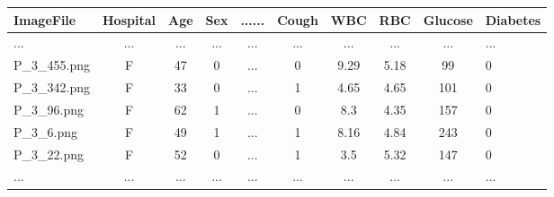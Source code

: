 \begin{tcolorbox}[tab2,tabularx={Y|Y|Y|Y|Y|Y|Y|Y|Y|Y|Y},title=\text{Estratto del dataset di test, in seguito alle modifiche}, width=1.25\textwidth, center=\textwidth]
    \centering
    \begin{tabular}{l|c|c|c|c|c|c|c|c|l}
        ImageFile & Hospital & Age & Sex & ...... & Cough & WBC & RBC & Glucose & Diabetes   \\ \hline \hline
        ... & ... & ... & ... & ... & ... & ... & ... & ... & ...\\
        P\_3\_455.png & F & 47 & 0 &...& 0 & 9.29 & 5.18 & 99  & 0  \\
        P\_3\_342.png & F & 33 & 0 &... & 1  & 4.65 & 4.65 & 101  & 0   \\
        P\_3\_96.png & F & 62 & 1 &... & 0  & 8.3 & 4.35 & 157 & 0   \\
        P\_3\_6.png & F & 49 & 1 &... & 1  & 8.16 & 4.84 & 243 & 0   \\
        P\_3\_22.png & F & 52 & 0 &... & 1  & 3.5 & 5.32 & 147  & 0  \\
        ... & ... & ... & ... & ... & ... & ... & ... & ... & ...
    \end{tabular}     
\end{tcolorbox}